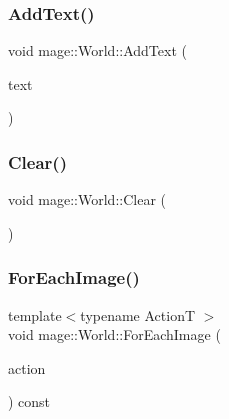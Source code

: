 \hypertarget{classmage_1_1_world_a30921162ddd11eb69f96f1266de581a9}{}\label{classmage_1_1_world_a30921162ddd11eb69f96f1266de581a9} 
\subsubsection{\texorpdfstring{Add\+Text()}{AddText()}}
{\footnotesize\ttfamily void mage\+::\+World\+::\+Add\+Text (\begin{DoxyParamCaption}\item[{\hyperlink{namespacemage_a1e01ae66713838a7a67d30e44c67703e}{Shared\+Ptr}$<$ \hyperlink{classmage_1_1_sprite_text}{Sprite\+Text} $>$}]{text }\end{DoxyParamCaption})}

\hypertarget{classmage_1_1_world_a5562299c0c78c7f6cb63b2de77c1fe79}{}\label{classmage_1_1_world_a5562299c0c78c7f6cb63b2de77c1fe79} 
\subsubsection{\texorpdfstring{Clear()}{Clear()}}
{\footnotesize\ttfamily void mage\+::\+World\+::\+Clear (\begin{DoxyParamCaption}{ }\end{DoxyParamCaption})}

\hypertarget{classmage_1_1_world_aa9438ba6ed5b7f10b04745d9277b397c}{}\label{classmage_1_1_world_aa9438ba6ed5b7f10b04745d9277b397c} 
\subsubsection{\texorpdfstring{For\+Each\+Image()}{ForEachImage()}}
{\footnotesize\ttfamily template$<$typename ActionT $>$ \\
void mage\+::\+World\+::\+For\+Each\+Image (\begin{DoxyParamCaption}\item[{ActionT}]{action }\end{DoxyParamCaption}) const}

\hypertarget{classmage_1_1_world_a7f6e04d24be88ae3126021d1b935ef72}{}\label{classmage_1_1_world_a7f6e04d24be88ae3126021d1b935ef72} 

